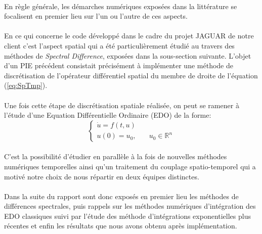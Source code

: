         \paragraph{}
        En règle générale, les démarches numériques exposées dans la littérature se focalisent en premier lieu sur l'un ou l'autre de ces aspects.

        \paragraph{}
        En ce qui concerne le code développé dans le cadre du projet JAGUAR de notre client c'est l'aspect spatial qui a été particulièrement étudié au travers des méthodes de \emph{Spectral Difference}, exposées dans la sous-section suivante. L'objet d'un PIE précédent consistait précisément à implémenter une méthode de discrétisation de l'opérateur différentiel spatial du membre de droite de l'équation (\ref{eq:SpTmp}).

        \paragraph{}
        Une fois cette étape de discrétisation spatiale réalisée, on peut se ramener à l'étude d'une Equation Différentielle Ordinaire (EDO) de la forme:
        \begin{equation}
            \left\{\begin{aligned}
                \dot{u} = f(t,u)&\\
                u(0) = u_0, &\quad u_0\in \mathbb{R}^n
            \end{aligned}\right.
            \label{eq:EDO}
        \end{equation}

        \paragraph{}
        C'est la possibilité d'étudier en parallèle à la fois de nouvelles méthodes numériques temporelles ainsi qu'un traitement du couplage spatio-temporel qui a motivé notre choix de nous répartir en deux équipes distinctes.

        \paragraph{}
        Dans la suite du rapport sont donc exposés en premier lieu les méthodes de différences spectrales, puis rappels sur les méthodes numériques d'intégration des EDO classiques suivi par l'étude des méthode d'intégrations exponentielles plus récentes et enfin les résultats que nous avons obtenu après implémentation.

